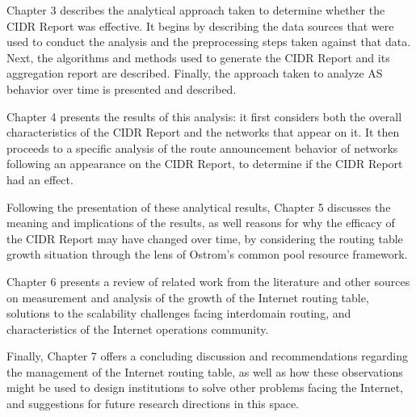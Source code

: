 Chapter 3 describes the analytical approach taken to determine whether the CIDR
Report was effective. It begins by describing the data sources that were used
to conduct the analysis and the preprocessing steps taken against that data.
Next, the algorithms and methods used to generate the CIDR Report and its
aggregation report are described. Finally, the approach taken to analyze AS
behavior over time is presented and described.

Chapter 4 presents the results of this analysis: it first considers both the
overall characteristics of the CIDR Report and the networks that appear on it.
It then proceeds to a specific analysis of the route announcement behavior of
networks following an appearance on the CIDR Report, to determine if the CIDR
Report had an effect.

Following the presentation of these analytical results, Chapter 5 discusses the
meaning and implications of the results, as well reasons for why the efficacy
of the CIDR Report may have changed over time, by considering the routing table
growth situation through the lens of Ostrom's common pool resource framework.

Chapter 6 presents a review of related work from the literature and other
sources on measurement and analysis of the growth of the Internet routing
table, solutions to the scalability challenges facing interdomain routing, and
characteristics of the Internet operations community.

Finally, Chapter 7 offers a concluding discussion and recommendations regarding
the management of the Internet routing table, as well as how these observations
might be used to design institutions to solve other problems facing the
Internet, and suggestions for future research directions in this space.
